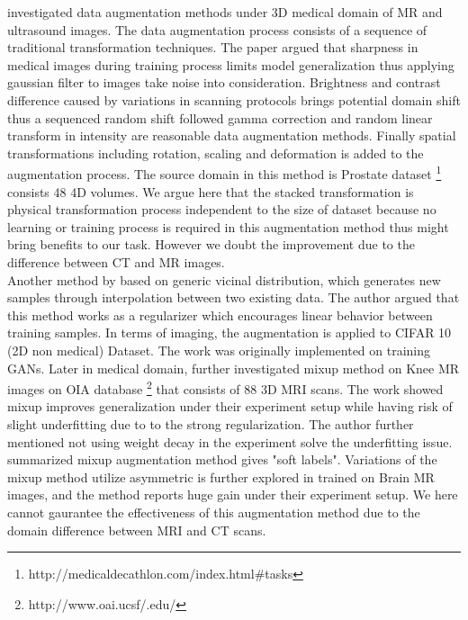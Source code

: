 \cite{zhang_when_2019} investigated data augmentation methods under 3D medical domain of MR and ultrasound images. 
The data augmentation process consists of a sequence of traditional transformation techniques. The paper argued that sharpness in medical images during training process limits model generalization thus applying gaussian filter to images take noise into consideration. Brightness and contrast difference caused by variations in scanning protocols brings potential domain shift thus a sequenced random shift followed gamma correction and random linear transform in intensity are reasonable data augmentation methods. Finally spatial transformations including rotation, scaling and deformation is added to the augmentation process.
The source domain in this method is Prostate dataset \footnote{http://medicaldecathlon.com/index.html\#tasks} consists 48 4D volumes.
We argue here that the stacked transformation is physical transformation process independent to the size of dataset because no learning or training process is required in this augmentation method thus might bring benefits to our task. However we doubt the improvement due to the difference between CT and MR images.\\

Another method by \cite{zhang_mixup_2018} based on generic vicinal distribution, which generates new samples through interpolation between two existing data. The author argued that this method works as a regularizer which encourages linear behavior between training samples. In terms of imaging, the augmentation is applied to CIFAR 10 (2D non medical) Dataset.
The work was originally implemented on training GANs. Later in medical domain, \cite{panfilov_improving_2019} further investigated mixup method on Knee MR images on OIA database \footnote{http://www.oai.ucsf/.edu/} that consists of 88 3D MRI scans. The work showed mixup improves generalization under their experiment setup while having risk of slight underfitting due to to the strong regularization. The author further mentioned not using weight decay in the experiment solve the underfitting issue.
\cite{tajbakhsh_embracing_2020} summarized mixup augmentation method gives "soft labels". Variations of the mixup method utilize asymmetric is further explored in \cite{li_overfitting_2019} trained on Brain MR images, and the method reports huge gain under their experiment setup.
We here cannot gaurantee the effectiveness of this augmentation method due to the domain difference between MRI and CT scans.

